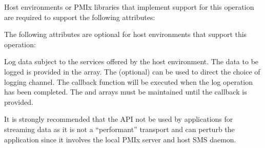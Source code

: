 
\divider

Host environments or \ac{PMIx} libraries that implement support for this operation are required to support the following attributes:


\reqattrend

\optattrstart
The following attributes are optional for host environments that support this operation:


\optattrend

\descr

Log data subject to the services offered by the host environment. The data to be logged is provided in the  array. The (optional)  can be used to direct the choice of logging channel.
The callback function will be executed when the log operation has been completed. The  and  arrays must be maintained until the callback is provided.

\adviceuserstart
It is strongly recommended that the  API not be used by applications for streaming data as it is not a ``performant'' transport and can perturb the application since it involves the local \ac{PMIx} server and host \ac{SMS} daemon.
\adviceuserend

